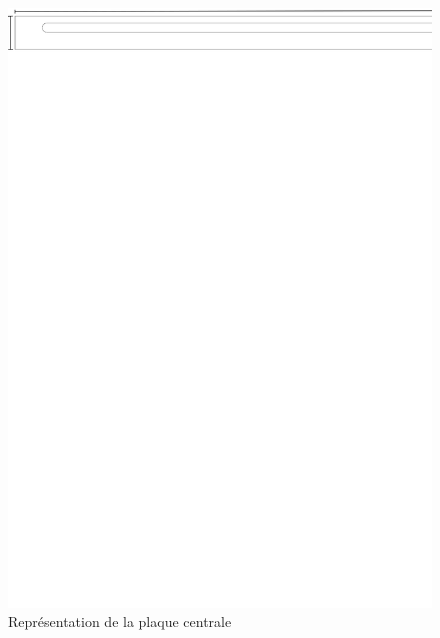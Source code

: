 \begin{figure}[H]
    \centering
    \includegraphics[width = \textwidth]{assets/figures/PlaquePassageMoteur.svg}
    \caption{Représentation de la plaque centrale}
    \label{fig:PLaPassMot}
\end{figure}